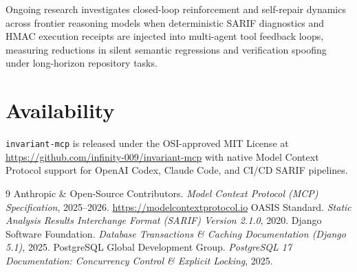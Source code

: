 \documentclass[11pt,a4paper]{article}
\begin{document}
Ongoing research investigates closed-loop reinforcement and self-repair dynamics across frontier reasoning models when deterministic SARIF diagnostics and HMAC execution receipts are injected into multi-agent tool feedback loops, measuring reductions in silent semantic regressions and verification spoofing under long-horizon repository tasks.

\section*{Availability}
\texttt{invariant-mcp} is released under the OSI-approved MIT License at \url{https://github.com/infinity-009/invariant-mcp} with native Model Context Protocol support for OpenAI Codex, Claude Code, and CI/CD SARIF pipelines.

\begin{thebibliography}{9}
 Anthropic \& Open-Source Contributors. \emph{Model Context Protocol (MCP) Specification}, 2025--2026. \url{https://modelcontextprotocol.io}
 OASIS Standard. \emph{Static Analysis Results Interchange Format (SARIF) Version 2.1.0}, 2020.
 Django Software Foundation. \emph{Database Transactions \& Caching Documentation (Django 5.1)}, 2025.
 PostgreSQL Global Development Group. \emph{PostgreSQL 17 Documentation: Concurrency Control \& Explicit Locking}, 2025.
\end{thebibliography}
\end{document}
